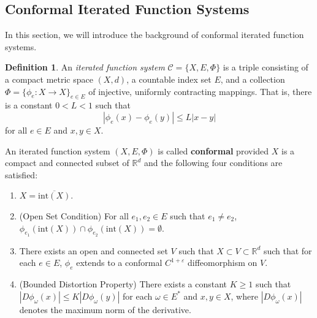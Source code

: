 \documentclass[10pt]{article}
\newtheorem{theorem}{Theorem}[section]
\theoremstyle{definition}
\newtheorem{definition}{Definition}[section]
\numberwithin{equation}{section}
\numberwithin{figure}{section}
\numberwithin{table}{section}
\begin{document}

\subsection{Conformal Iterated Function Systems}


In this section, we will introduce the background of conformal iterated function systems.

\begin{definition}
An \textit{iterated function system} $\mathcal{C}=\{X,E,\Phi\}$ is a triple consisting of a compact metric space $(X,d)$, a countable index set $E$, and a collection $\Phi=\{\phi_e:X\to X\}_{e\in E}$ of injective, uniformly contracting mappings. That is, there is a constant $0<L<1$ such that
$$|\phi_e(x)-\phi_e(y)|\leq L|x-y|$$
for all $e\in E$ and $x,y\in X$. 

An iterated function system $(X,E,\Phi)$ is called \textbf{conformal} provided $X$ is a compact and connected subset of $\mathbb{R}^d$ and the following four conditions are satisfied:
\begin{enumerate}
\item $X=\overline{\mathrm{int}(X)}$.
\item (Open Set Condition) For all $e_1,e_2\in E$ such that $e_1\neq e_2$, $\phi_{e_1}(\mathrm{int}(X))\cap\phi_{e_2}(\mathrm{int}(X))=\emptyset$.
\item There exists an open and connected set $V$ such that $X\subset V\subset\mathbb{R}^d$ such that for each $e\in E$, $\phi_e$ extends to a conformal $C^{1+\varepsilon}$ diffeomorphism on $V$.
\item (Bounded Distortion Property) There exists a constant $K\geq 1$ such that $|D\phi_\omega(x)|\leq K|D\phi_\omega(y)|$ for each $\omega\in E^*$ and $x,y\in X$, where $|D\phi_\omega(x)|$ denotes the maximum norm of the derivative.
\end{enumerate}
\end{definition}
\end{document}
